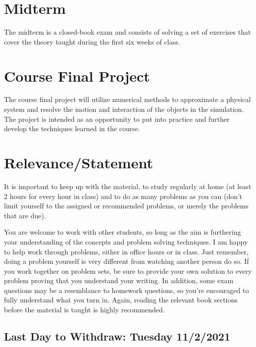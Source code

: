 \documentclass[12pt]{article}
\begin{document}
  \section*{Midterm}


	The midterm is a closed-book exam and consists of solving a set of exercises that cover the theory taught during the first six weeks of class.


  
  \section*{Course Final Project}
  
  The course final project will utilize numerical methods to approximate a physical
  system and resolve the motion and interaction of the objects in the simulation.
  The project is intended as an opportunity to put into practice and further
  develop the techniques learned in the course. 
  


\section*{Relevance/Statement}

It is important to keep up with the material, to study regularly at home (at least 2 hours for every hour in class) and to do as many problems as you can 
(don’t limit yourself to the assigned or recommended problems, or merely the problems that are due).  

	You are welcome to work with other students, so long as the aim is furthering your understanding of the concepts and problem solving techniques. I am 
	happy to help work through problems, either in office hours or in class. Just remember, doing a problem yourself is very different from watching another 
	person do so. If you work together on problem sets, be sure to provide your own solution to every problem proving that you understand your writing. 
	In addition, some exam questions may be a resemblance to homework questions, so you’re encouraged to fully understand what you turn in. 
	Again, reading the relevant book sections before the material is taught is highly recommended. 


\subsection*{Last Day to Withdraw:   Tuesday 11/2/2021}

\vspace{5 mm}
\end{document}
